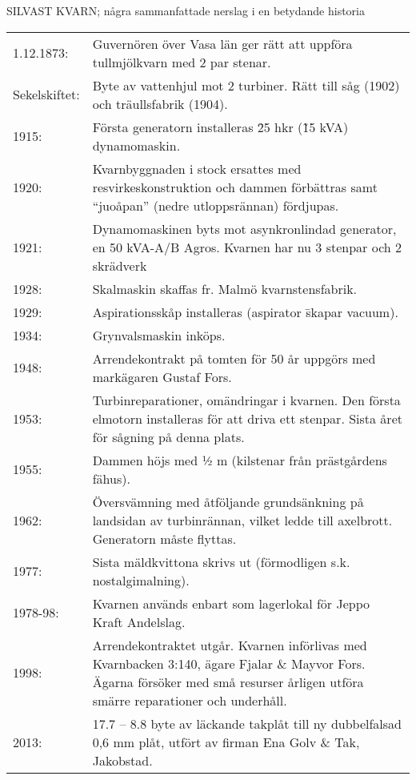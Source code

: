 SILVAST KVARN; några sammanfattade nerslag i en betydande historia
\begin{center}
  \begin{longtable}{l p{}}
    \hline
    1.12.1873: &	Guvernören över Vasa län ger rätt att uppföra tullmjölkvarn med 2 par	stenar. \\
    Sekelskiftet: &	Byte av vattenhjul mot 2 turbiner. Rätt till såg (1902) och träullsfabrik (1904). \\
    1915: &	Första generatorn installeras \= 25 hkr (\~15 kVA) dynamomaskin. \\
    1920: &	Kvarnbyggnaden i stock ersattes med resvirkeskonstruktion och dammen förbättras samt ``juoåpan'' (nedre utloppsrännan) fördjupas. \\
    1921: & Dynamomaskinen byts mot asynkronlindad generator, en 50 kVA-A/B Agros. Kvarnen har nu 3 stenpar och 2 skrädverk \\
    1928: &	Skalmaskin skaffas fr. Malmö kvarnstensfabrik. \\
    1929: &	Aspirationsskåp installeras (aspirator \= skapar vacuum). \\
    1934: &	Grynvalsmaskin inköps. \\
    1948:	&	Arrendekontrakt på tomten för 50 år uppgörs med markägaren Gustaf Fors. \\
    1953: &	Turbinreparationer, omändringar i kvarnen. Den första elmotorn installeras för att driva ett stenpar. Sista året för sågning på denna plats. \\
    1955: &	Dammen höjs med ½ m (kilstenar från prästgårdens fähus). \\
    1962: &	Översvämning med åtföljande grundsänkning på landsidan av turbinrännan, vilket ledde till axelbrott. Generatorn måste flyttas. \\
    1977: &	Sista mäldkvittona skrivs ut (förmodligen s.k. nostalgimalning). \\
    1978-98: & Kvarnen används enbart som lagerlokal för Jeppo Kraft Andelslag. \\
    1998:	&	Arrendekontraktet utgår. Kvarnen införlivas med Kvarnbacken 3:140, ägare Fjalar \& Mayvor Fors. Ägarna försöker med små resurser årligen utföra smärre reparationer och underhåll. \\
    2013:	&	17.7 – 8.8 byte av läckande takplåt till ny dubbelfalsad 0,6 mm plåt, utfört av firman Ena Golv \& Tak, Jakobstad. \\
    \hline
  \end{longtable}
\end{center}




